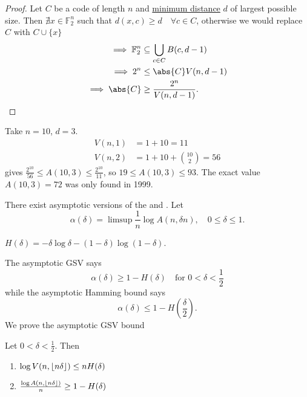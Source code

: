 \documentclass{article}
\DeclarePairedDelimiter{\floor}{\lfloor}{\rfloor}
\newcommand{\1}[1]{\mathbbm{1}_{#1}}
\begin{document}
\begin{proof}
    Let $C$ be a code of length $n$ and \hyperlink{def:minimumDistanceCode}{minimum distance} $d$ of largest possible size.
    Then $\nexists x \in \mathbb{F}_2^n$ such that $d(x, c) \geq d \quad \forall c \in C$, otherwise we would replace $C$ with $C \cup \{x\}$
    \begin{align*}
        \implies \mathbb{F}_2^n &\subseteq \bigcup_{c \in C}B(c, d-1) \\
        \implies 2^n &\leq \abs{C} V(n, d-1) \\
        \implies \abs{C} &\geq \frac{2^n}{V(n, d-1)}. \qedhere
    \end{align*}
\end{proof}
\begin{eg}
    Take $n=10$, $d=3$.
    \begin{align*}
        V(n, 1) &= 1 + 10 = 11 \\
        V(n, 2) &= 1 + 10 + \binom{10}{2} = 56
    \end{align*}
     gives $\frac{2^{10}}{56} \leq A(10, 3) \leq \frac{2^{10}}{11}$, so $19 \leq A(10, 3) \leq 93$. The exact value $A(10, 3) = 72$ was only found in 1999.
\end{eg}
There exist asymptotic versions of the  and .
Let
\begin{equation*}\alpha(\delta) = \limsup \frac{1}{n} \log A(n, \delta n), \quad 0 \leq \delta \leq 1.\end{equation*}
\begin{notation}
    $H(\delta) = -\delta \log \delta - (1-\delta) \log (1-\delta)$.
\end{notation}
The asymptotic GSV says
\begin{equation*}
    \alpha(\delta) \geq 1 - H(\delta) \quad \text{for } 0 <\delta < \frac{1}{2}
\end{equation*}
while the asymptotic Hamming bound says
\begin{equation*}
    \alpha(\delta) \leq 1 - H\left(\frac{\delta}{2}\right).
\end{equation*}
We prove the asymptotic GSV bound
\begin{nprop}\label{prop:2.7}
    Let $0 < \delta < \frac{1}{2}$. Then
    \begin{enumerate}[label=(\roman*)]
        \item $\log V(n, \floor{n \delta}) \leq n H(\delta)$
        \item $\frac{\log A(n, \floor{n \delta})}{n} \geq 1 - H(\delta)$
    \end{enumerate}
\end{nprop}
\end{document}
